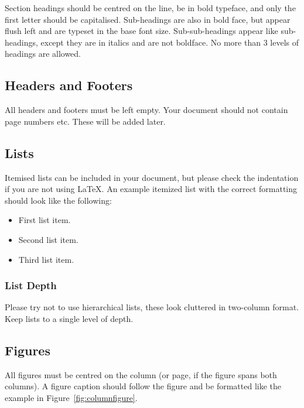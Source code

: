 \documentclass{cmppgr}
\begin{document}
Section headings should be centred on the line, be in bold typeface, and only the first letter should be capitalised. Sub-headings are also in bold face, but appear flush left and are typeset in the base font size. Sub-sub-headings appear like sub-headings, except they are in italics and are not boldface. No more than 3 levels of headings are allowed.

\subsection{Headers and Footers}

All headers and footers must be left empty. Your document should not contain page numbers etc. These will be added later.

\subsection{Lists}

Itemised lists can be included in your document, but please check the indentation if you are not using \LaTeX. An example itemized list with the correct formatting should look like the following:
%
\begin{itemize}
\item{First list item.}
\item{Second list item.}
\item{Third list item.}
\end{itemize}
%

\subsubsection{List Depth}

Please try not to use hierarchical lists, these look cluttered in two-column format. Keep lists to a single level of depth.

\subsection{Figures}

All figures must be centred on the column (or page, if the figure spans both columns). A figure caption should follow the figure and be formatted like the example in Figure~\ref{fig:columnfigure}.
\end{document}
